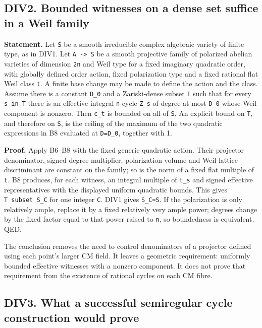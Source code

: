 \documentclass[11pt,a4paper]{article}
\theoremstyle{definition}
\begin{document}
\subsection{DIV2. Bounded witnesses on a dense set suffice in a Weil
family}\label{div2.-bounded-witnesses-on-a-dense-set-suffice-in-a-weil-family}

\textbf{Statement.} Let \texttt{S} be a smooth irreducible complex
algebraic variety of finite type, as in DIV1. Let
\texttt{A\ -\textgreater{}\ S} be a smooth projective family of
polarized abelian varieties of dimension \texttt{2n} and Weil type for a
fixed imaginary quadratic order, with globally defined order action,
fixed polarization type and a fixed rational flat Weil class \texttt{t}.
A finite base change may be made to define the action and the class.
Assume there is a constant \texttt{D\_0} and a Zariski-dense subset
\texttt{T} such that for every \texttt{s\ in\ T} there is an effective
integral \texttt{n}-cycle \texttt{Z\_s} of degree at most \texttt{D\_0}
whose Weil component is nonzero. Then \texttt{c\_t} is bounded on all of
\texttt{S}. An explicit bound on \texttt{T}, and therefore on
\texttt{S}, is the ceiling of the maximum of the two quadratic
expressions in B8 evaluated at \texttt{D=D\_0}, together with 1.

\textbf{Proof.} Apply B6--B8 with the fixed generic quadratic action.
Their projector denominator, signed-degree multiplier, polarization
volume and Weil-lattice discriminant are constant on the family; so is
the norm of a fixed flat multiple of \texttt{t}. B8 produces, for each
witness, an integral multiple of \texttt{t\_s} and signed effective
representatives with the displayed uniform quadratic bounds. This gives
\texttt{T\ subset\ S\_C} for one integer \texttt{C}. DIV1 gives
\texttt{S\_C=S}. If the polarization is only relatively ample, replace
it by a fixed relatively very ample power; degrees change by the fixed
factor equal to that power raised to \texttt{n}, so boundedness is
equivalent. QED.

The conclusion removes the need to control denominators of a projector
defined using each point's larger CM field. It leaves a geometric
requirement: uniformly bounded effective witnesses with a nonzero
component. It does not prove that requirement from the existence of
rational cycles on each CM fibre.

\subsection{DIV3. What a successful semiregular cycle construction would
prove}\label{div3.-what-a-successful-semiregular-cycle-construction-would-prove}
\end{document}
